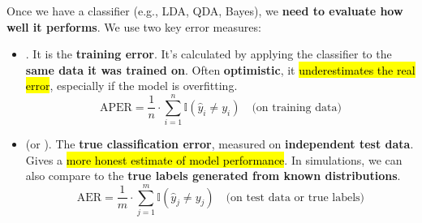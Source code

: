 \highspace
Once we have a classifier (e.g., LDA, QDA, Bayes), we \textbf{need to evaluate how well it performs}. We use two key error measures:
\begin{itemize}
    \item {}. It is the \textbf{training error}. It's calculated by applying the classifier to the \textbf{same data it was trained on}. Often \textbf{optimistic}, it \hl{underestimates the real error}, especially if the model is overfitting.
    \begin{equation}
        \text{APER} = \dfrac{1}{n} \cdot \displaystyle\sum_{i=1}^{n} \mathbb{I}\left( \hat{y}_{i} \neq y_{i} \right) \quad \text{(on training data)}
    \end{equation}

    \item {} (or ). The \textbf{true classification error}, measured on \textbf{independent test data}. Gives a \hl{more honest estimate of model performance}. In simulations, we can also compare to the \textbf{true labels generated from known distributions}.
    \begin{equation}
        \text{AER} = \dfrac{1}{m} \cdot \displaystyle\sum_{j=1}^{m} \mathbb{I}\left( \hat{y}_{j} \neq y_{j} \right) \quad \text{(on test data or true labels)}
    \end{equation}
\end{itemize}